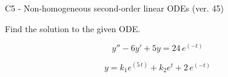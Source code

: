 \begin{exercise}
  \begin{exerciseTitle}C5 - Non-homogeneous second-order linear ODEs (ver. 45)\end{exerciseTitle}
  \begin{exerciseStatement}
    
Find the solution to the given ODE.

    
\[y''-6y'+5y = 24 \, e^{\left(-t\right)}\]

  \end{exerciseStatement}
  \begin{exerciseAnswer}
    
\[y= k_{1} e^{\left(5 \, t\right)} + k_{2} e^{t} + 2 \, e^{\left(-t\right)}\]

  \end{exerciseAnswer}
\end{exercise}